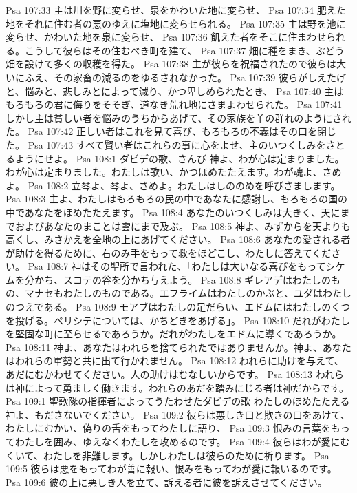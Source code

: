 Psa 107:33  主は川を野に変らせ、泉をかわいた地に変らせ、
Psa 107:34  肥えた地をそれに住む者の悪のゆえに塩地に変らせられる。
Psa 107:35  主は野を池に変らせ、かわいた地を泉に変らせ、
Psa 107:36  飢えた者をそこに住まわせられる。こうして彼らはその住むべき町を建て、
Psa 107:37  畑に種をまき、ぶどう畑を設けて多くの収穫を得た。
Psa 107:38  主が彼らを祝福されたので彼らは大いにふえ、その家畜の減るのをゆるされなかった。
Psa 107:39  彼らがしえたげと、悩みと、悲しみとによって減り、かつ卑しめられたとき、
Psa 107:40  主はもろもろの君に侮りをそそぎ、道なき荒れ地にさまよわせられた。
Psa 107:41  しかし主は貧しい者を悩みのうちからあげて、その家族を羊の群れのようにされた。
Psa 107:42  正しい者はこれを見て喜び、もろもろの不義はその口を閉じた。
Psa 107:43  すべて賢い者はこれらの事に心をよせ、主のいつくしみをさとるようにせよ。
Psa 108:1  ダビデの歌、さんび 神よ、わが心は定まりました。わが心は定まりました。わたしは歌い、かつほめたたえます。わが魂よ、さめよ。
Psa 108:2  立琴よ、琴よ、さめよ。わたしはしののめを呼びさまします。
Psa 108:3  主よ、わたしはもろもろの民の中であなたに感謝し、もろもろの国の中であなたをほめたたえます。
Psa 108:4  あなたのいつくしみは大きく、天にまでおよびあなたのまことは雲にまで及ぶ。
Psa 108:5  神よ、みずからを天よりも高くし、みさかえを全地の上にあげてください。
Psa 108:6  あなたの愛される者が助けを得るために、右のみ手をもって救をほどこし、わたしに答えてください。
Psa 108:7  神はその聖所で言われた、「わたしは大いなる喜びをもってシケムを分かち、スコテの谷を分かち与えよう。
Psa 108:8  ギレアデはわたしのもの、マナセもわたしのものである。エフライムはわたしのかぶと、ユダはわたしのつえである。
Psa 108:9  モアブはわたしの足だらい、エドムにはわたしのくつを投げる。ペリシテについては、かちどきをあげる」。
Psa 108:10  だれがわたしを堅固な町に至らせるであろうか。だれがわたしをエドムに導くであろうか。
Psa 108:11  神よ、あなたはわれらを捨てられたではありませんか。神よ、あなたはわれらの軍勢と共に出て行かれません。
Psa 108:12  われらに助けを与えて、あだにむかわせてください。人の助けはむなしいからです。
Psa 108:13  われらは神によって勇ましく働きます。われらのあだを踏みにじる者は神だからです。
Psa 109:1  聖歌隊の指揮者によってうたわせたダビデの歌 わたしのほめたたえる神よ、もださないでください。
Psa 109:2  彼らは悪しき口と欺きの口をあけて、わたしにむかい、偽りの舌をもってわたしに語り、
Psa 109:3  恨みの言葉をもってわたしを囲み、ゆえなくわたしを攻めるのです。
Psa 109:4  彼らはわが愛にむくいて、わたしを非難します。しかしわたしは彼らのために祈ります。
Psa 109:5  彼らは悪をもってわが善に報い、恨みをもってわが愛に報いるのです。
Psa 109:6  彼の上に悪しき人を立て、訴える者に彼を訴えさせてください。
